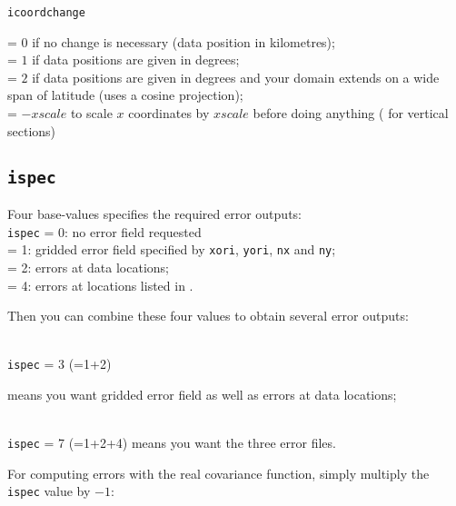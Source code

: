 \texttt{icoordchange} \begin{minipage}[t]{.7\textwidth} = $0$ if no change is necessary (data position in kilometres);\\
                                                        = $1$ if data positions are given in degrees;\\
                                                        = $2$ if data positions are given in degrees and your domain extends on a wide span of latitude                                                           (uses a cosine projection);\\
                                                        = $-xscale$ to scale $x$ coordinates by $xscale$ before doing anything ( for vertical                                                              sections)
                      \end{minipage}
                      
                      
\subsection{\texttt{ispec}}

Four base-values specifies the required error outputs:\\

\texttt{ispec}       = 0\qquad: no error field requested\\
  = 1\qquad: gridded error field specified by \texttt{xori}, \texttt{yori}, \texttt{nx} and \texttt{ny}; \\
  = 2\qquad: errors at data locations;\\
  = 4\qquad: errors at locations listed in .

Then you can combine these four values to obtain several error outputs:

\examples\\
\texttt{ispec}             = 3 (=1+2)\hphantom{+4} \qquad \begin{minipage}[t]{.7\textwidth}means you want gridded error field as well as errors at data locations;\end{minipage}\\ 
\texttt{ispec}             = 7 (=1+2+4) \qquad means you want the three error files.


For computing errors with the real covariance function, %
simply multiply the \texttt{ispec} value by $-1$:

